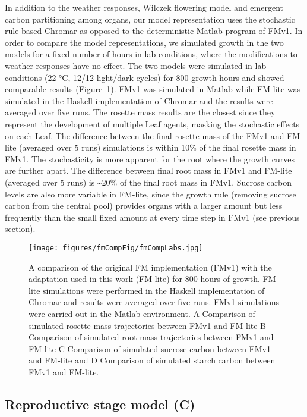 In addition to the weather responses, Wilczek flowering model and emergent
carbon partitioning among organs, our model representation uses the stochastic
rule-based Chromar as opposed to the deterministic Matlab program of FMv1. In
order to compare the model representations, we simulated growth in the two
models for a fixed number of hours in lab conditions, where the modifications to
weather responses have no effect.  The two models were simulated in lab
conditions (22 °C, 12/12 light/dark cycles) for \(800\) growth hours and showed
comparable results (Figure~\ref{fig:comp}). FMv1 was simulated in Matlab while
FM-lite was simulated in the Haskell implementation of Chromar and the results
were averaged over five runs. The rosette mass results are the closest since
they represent the development of multiple Leaf agents, masking the stochastic
effects on each Leaf. The difference between the final rosette mass of the FMv1
and FM-lite (averaged over 5 runs) simulations is within 10\% of the final
rosette mass in FMv1. The stochasticity is more apparent for the root where the
growth curves are further apart. The difference between final root mass in FMv1
and FM-lite (averaged over 5 runs) is \textasciitilde{}20\% of the final root
mass in FMv1. Sucrose carbon levels are also more variable in FM-lite, since the
growth rule (removing sucrose carbon from the central pool) provides organs with
a larger amount but less frequently than the small fixed amount at every time
step in FMv1 (see previous section).

\begin{figure}[tb]
  \centering
  \texttt{[image: figures/fmCompFig/fmCompLabs.jpg]}
  \caption{A comparison of the original FM implementation (FMv1) with the
    adaptation used in this work (FM-lite) for 800 hours of growth. FM-lite
    simulations were performed in the Haskell implementation of Chromar and
    results were averaged over five runs. FMv1 simulations were carried out in
    the Matlab environment. A Comparison of simulated rosette mass trajectories
    between FMv1 and FM-lite B Comparison of simulated root mass trajectories
    between FMv1 and FM-lite C Comparison of simulated sucrose carbon between
    FMv1 and FM-lite and D Comparison of simulated starch carbon between FMv1
    and FM-lite.}
  \label{fig:comp}
\end{figure}

\subsection{Reproductive stage model (C)}
\label{reproductive-stage-model-c}

